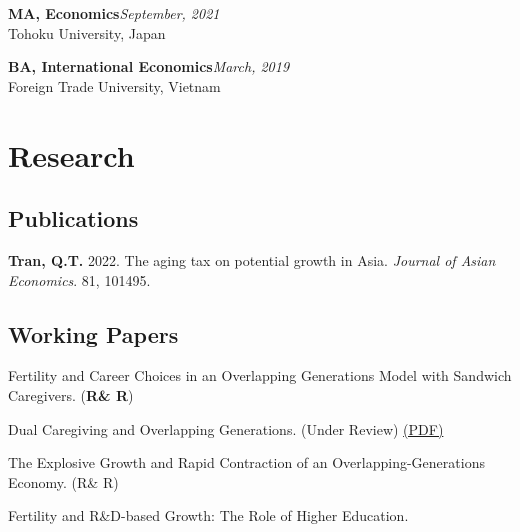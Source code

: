 \documentclass[12pt]{article}
\begin{document}
\textbf{MA, Economics}\hfill\emph{September, 2021}\\
Tohoku University, Japan

\textbf{BA, International Economics}\hfill\emph{March, 2019}\\
Foreign Trade University, Vietnam


\section{Research}

\subsection{Publications}

\begin{enumerate}[label={[\arabic*]}]

\item \textbf{Tran, Q.T.} 2022. The aging tax on potential growth in Asia. \textit{Journal of Asian Economics}. 81, 101495. 
\end{enumerate}

\subsection{Working Papers}

\begin{enumerate}[label={[\arabic*]}]

\item Fertility and Career Choices in an Overlapping Generations Model with Sandwich Caregivers. (\textbf{R\& R})

\item Dual Caregiving and Overlapping Generations. (Under Review) \href{https://ideas.repec.org/p/toh/tupdaa/64.html}{(PDF)}

\item The Explosive Growth and Rapid Contraction of an Overlapping-Generations Economy. (R\& R)

\item Fertility and R\&D-based Growth: The Role of Higher Education.

\end{enumerate}
\end{document}
